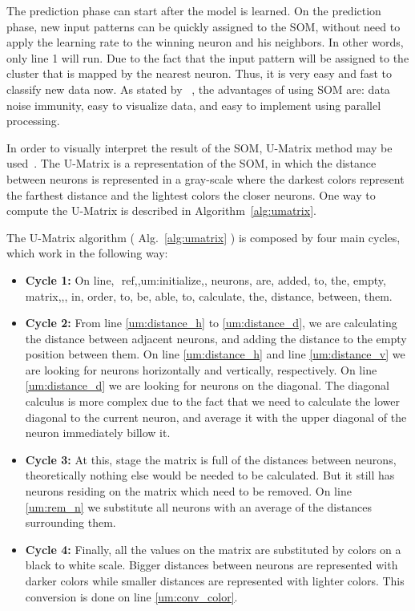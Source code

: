 The prediction phase can start after the model is learned. On the prediction phase, new input patterns can be quickly assigned to the \ac{SOM}, without need to apply the learning rate to the winning neuron and his neighbors. In other words, only line 1 will run. Due to the fact that the input pattern will be assigned to the cluster that is mapped by the nearest neuron. Thus, it is very easy and fast to classify new data now. As stated by ~\citet{Liu2012b}, the advantages of using \ac{SOM} are: data noise immunity, easy to visualize data, and easy to implement using parallel processing.

In order to visually interpret the result of the \ac{SOM}, \ac{U-Matrix} method may be used~\citep{Bacao2005}. The \ac{U-Matrix} is a representation of the \ac{SOM}, in which the distance between neurons is represented in a gray-scale where the darkest colors represent the farthest distance and the lightest colors the closer neurons. One way to compute the \ac{U-Matrix} is described in Algorithm~\ref{alg:umatrix}. 



The \ac{U-Matrix} algorithm ( Alg.~\ref{alg:umatrix} ) is composed by four main cycles, which work in the following way:

\begin{itemize}
  \item \textbf{Cycle 1: } On line,~\,ref,{,um:initialize,}, neurons, are, added, to, the, empty, matrix,,, in, order, to, be, able, to, calculate, the, distance, between, them.
  \item \textbf{Cycle 2:} From line \ref{um:distance_h} to \ref{um:distance_d}, we are calculating the distance between adjacent neurons, and adding the distance to the empty position between them. On line \ref{um:distance_h} and line \ref{um:distance_v} we are looking for neurons horizontally and vertically, respectively. On line \ref{um:distance_d} we are looking for neurons on the diagonal. The diagonal calculus is more complex due to the fact that we need to calculate the lower diagonal to the current neuron, and average it with the upper diagonal of the neuron immediately billow it.
    \item \textbf{Cycle 3: }At this, stage the matrix is full of the distances between neurons, theoretically nothing else would be needed to be calculated. But it still has neurons residing on the matrix which need to be removed. On line \ref{um:rem_n} we substitute all neurons with an average of the distances surrounding them.
    \item \textbf{Cycle 4:}  Finally, all the values on the matrix are substituted by colors on a black to white scale. Bigger distances between neurons are represented with darker colors while smaller distances are represented with lighter colors. This conversion is done on line \ref{um:conv_color}.
  
\end{itemize}

